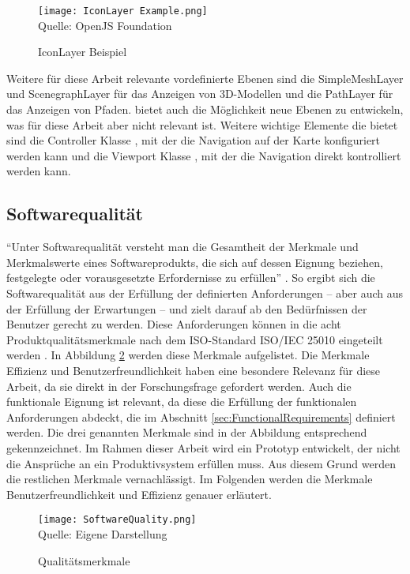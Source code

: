 \begin{figure}[H]
    \caption{IconLayer Beispiel}\label{fig:IconLayerExample}
    \texttt{[image: IconLayer Example.png]}
    \\
    Quelle: OpenJS Foundation \cite{DeckGlMeteorites}
\end{figure}

Weitere für diese Arbeit relevante vordefinierte Ebenen sind die SimpleMeshLayer \cite{DeckglSimpleMeshLayer} und ScenegraphLayer \cite{DeckglScenegraphLayer} für das Anzeigen von 3D-Modellen und die PathLayer für das Anzeigen von Pfaden. \deckgl{} bietet auch die Möglichkeit neue Ebenen zu entwickeln, was für diese Arbeit aber nicht relevant ist. Weitere wichtige Elemente die \deckgl{} bietet sind die Controller Klasse \cite{DeckglController}, mit der die Navigation auf der Karte konfiguriert werden kann und die Viewport Klasse \cite{DeckglViewport}, mit der die Navigation direkt kontrolliert werden kann.

\subsection{Softwarequalität}
``Unter Softwarequalität versteht man die Gesamtheit der Merkmale und Merkmalswerte eines Softwareprodukts, die sich auf dessen Eignung beziehen, festgelegte oder vorausgesetzte Erfordernisse zu erfüllen'' \cite[S.~257]{Balzert1998}. So ergibt sich die Softwarequalität aus der Erfüllung der definierten Anforderungen – aber auch aus der Erfüllung der Erwartungen – und zielt darauf ab den Bedürfnissen der Benutzer gerecht zu werden. Diese Anforderungen können in die acht Produktqualitätsmerkmale nach dem ISO-Standard ISO/IEC 25010 eingeteilt werden \cite{ISO25010}. In Abbildung \ref{fig:SoftwareQuality} werden diese Merkmale aufgelistet. Die Merkmale Effizienz und Benutzerfreundlichkeit haben eine besondere Relevanz für diese Arbeit, da sie direkt in der Forschungsfrage gefordert werden. Auch die funktionale Eignung ist relevant, da diese die Erfüllung der funktionalen Anforderungen abdeckt, die im Abschnitt \ref{sec:FunctionalRequirements} definiert werden. Die drei genannten Merkmale sind in der Abbildung entsprechend gekennzeichnet. Im Rahmen dieser Arbeit wird ein Prototyp entwickelt, der nicht die Ansprüche an ein Produktivsystem erfüllen muss. Aus diesem Grund werden die restlichen Merkmale vernachlässigt. Im Folgenden werden die Merkmale Benutzerfreundlichkeit und Effizienz genauer erläutert.

\begin{figure}[H]
    \caption{Qualitätsmerkmale}\label{fig:SoftwareQuality}
    \texttt{[image: SoftwareQuality.png]}
    \\
    Quelle: Eigene Darstellung
\end{figure}

